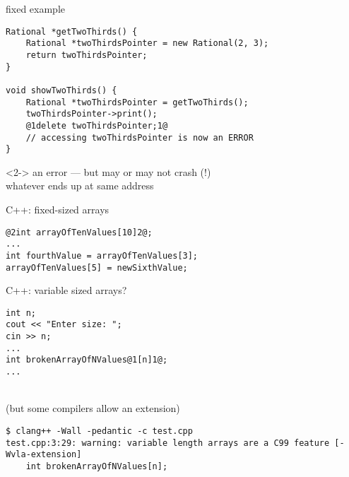 \begin{frame}[fragile,label=cppNewDelete3]{fixed example}
\begin{lstlisting}
Rational *getTwoThirds() {
    Rational *twoThirdsPointer = new Rational(2, 3);
    return twoThirdsPointer;
}

void showTwoThirds() {
    Rational *twoThirdsPointer = getTwoThirds();
    twoThirdsPointer->print();
    @1delete twoThirdsPointer;1@
    // accessing twoThirdsPointer is now an ERROR
}
\end{lstlisting}
\begin{visibleenv}<2->
an error --- but may or may not crash (!) \\
whatever ends up at same address
\end{visibleenv}
\end{frame}


\begin{frame}[fragile,label=cppArray]{C++: fixed-sized arrays}
\begin{lstlisting}
@2int arrayOfTenValues[10]2@;
...
int fourthValue = arrayOfTenValues[3];
arrayOfTenValues[5] = newSixthValue;
\end{lstlisting}
\end{frame}

\begin{frame}[fragile,label=vlas]{C++: variable sized arrays?}
\begin{lstlisting}
int n;
cout << "Enter size: ";
cin >> n;
...
int brokenArrayOfNValues@1[n]1@;
...
\end{lstlisting}
 \\
(but some compilers allow an extension)
\begin{Verbatim}[fontsize=\small]
$ clang++ -Wall -pedantic -c test.cpp
test.cpp:3:29: warning: variable length arrays are a C99 feature [-Wvla-extension]
    int brokenArrayOfNValues[n];
\end{Verbatim}
\end{frame}


